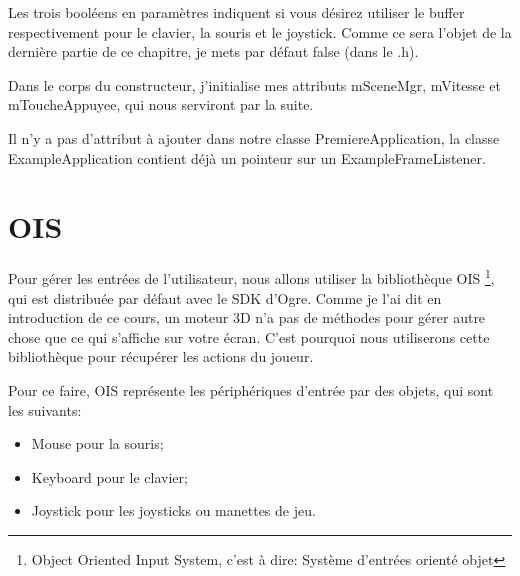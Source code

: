 \documentclass[10pt,a4paper]{report}
\begin{document}
Les trois bool\'eens en param\`etres indiquent si vous d\'esirez utiliser le buffer respectivement pour le clavier, la souris et le joystick. Comme ce sera l'objet de la derni\`ere partie de ce chapitre, je mets par d\'efaut false (dans le .h).

Dans le corps du constructeur, j'initialise mes attributs mSceneMgr, mVitesse et mToucheAppuyee, qui nous serviront par la suite.

Il n'y a pas d'attribut \`{a} ajouter dans notre classe PremiereApplication, la classe ExampleApplication contient d\'ej\`{a} un pointeur sur un ExampleFrameListener.

       




































\section{OIS}


Pour g\'erer les entr\'ees de l'utilisateur, nous allons utiliser la biblioth\`eque OIS \footnote{Object Oriented Input System, c'est \`a dire: Syst\`eme d'entr\'ees orient\'e objet}, qui est distribu\'ee par d\'efaut avec le SDK d'Ogre. Comme je l'ai dit en introduction de ce cours, un moteur 3D n'a pas de m\'ethodes pour g\'erer autre chose que ce qui s'affiche sur votre \'ecran. C'est pourquoi nous utiliserons cette biblioth\`eque pour r\'ecup\'erer les actions du joueur.\newline


Pour ce faire, OIS repr\'esente les p\'eriph\'eriques d'entr\'ee par des objets, qui sont les suivants:

\begin{itemize}
\item Mouse pour la souris;
\item Keyboard pour le clavier;
\item Joystick pour les joysticks ou manettes de jeu.\newline
\end{itemize}
    
\end{document}

